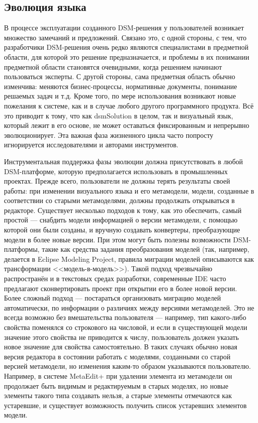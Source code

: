 \subsection{Эволюция языка}
В процессе эксплуатации созданного DSM-решения у пользователей возникает множество 
замечаний и предложений. Связано это, с одной стороны, с тем, что разработчики DSM-решения 
очень редко являются специалистами в предметной области, для которой это решение предназначается, 
и проблемы в их понимании предметной области становятся очевидными, когда решением 
начинают пользоваться эксперты. С другой стороны, сама предметная область обычно изменчива: 
меняются бизнес-процессы, нормативные документы, понимание решаемых задач и т.д. Кроме 
того, по мере использования возникают новые пожелания к системе, как и в случае любого 
другого программного продукта. Всё это приводит к тому, что как \ac{dsmSolution} в целом, 
так и визуальный язык, который лежит в его основе, не может оставаться фиксированным 
и непрерывно эволюционирует. Эта важная фаза жизненного цикла часто попросту игнорируется 
исследователями и авторами инструментов.

Инструментальная поддержка фазы эволюции должна присутствовать в любой DSM-платформе, 
которую предполагается использовать в промышленных проектах. Прежде всего, пользователи 
не должны терять результаты своей работы: при изменении визуального языка и его метамодели, 
модели, созданные в соответствии со старыми метамоделями, должны продолжать открываться в редакторе. 
Существует несколько подходов к тому, как это обеспечить, самый простой --- снабдить 
модели информацией о версии метамодели, с помощью которой они были созданы, и вручную 
создавать конвертеры, преобразующие модели в более новые версии. При этом могут быть 
полезны возможности DSM-платформы, такие как средства задания преобразования моделей 
(так, например, делается в Eclipse Modeling Project, правила миграции моделей описываются 
как трансформации <<модель-в-модель>>). Такой подход чрезвычайно распространён и в 
текстовых средах разработки, современные IDE часто предлагают сконвертировать проект 
при открытии его в более новой версии. Более сложный подход --- постараться организовать 
миграцию моделей автоматически, по информации о различиях между версиями метамоделей. 
Это не всегда возможно без вмешательства пользователя --- например, тип какого-либо 
свойства поменялся со строкового на числовой, и если в существующей модели значение 
этого свойства не приводится к числу, пользователь должен указать новое значение для свойства 
самостоятельно. В таких случаях обычно новая версия редактора в состоянии работать 
с моделями, созданными со старой версией метамодели, но изменения каким-то образом 
указываются пользователю. Например, в системе MetaEdit+ при удалении элемента из метамодели 
он продолжает быть видимым и редактируемым в старых моделях, но новые элементы такого 
типа создавать нельзя, а старые элементы отмечаются как устаревшие, и существует возможность 
получить список устаревших элементов модели.

